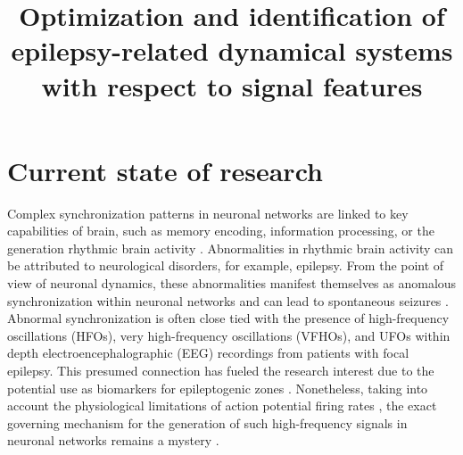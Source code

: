 \documentclass[a4paper,11pt]{scrartcl}
\title{Optimization and identification of epilepsy-related dynamical systems with respect to signal features}
\begin{document}
\maketitle
\tableofcontents

\newpage

\section{Current state of research}\label{sec:state}



Complex synchronization patterns in neuronal networks are linked to key capabilities of brain, such as memory encoding, information processing, or the generation rhythmic brain activity \cite{Izhikevich2006, Song2018}. Abnormalities in rhythmic brain activity can be attributed to neurological disorders, for example, epilepsy. From the point of view of neuronal dynamics, these abnormalities manifest themselves as anomalous synchronization within neuronal networks and can lead to spontaneous seizures \cite{Jiruska2013}. Abnormal synchronization is often close tied with the presence of high-frequency oscillations (HFOs), very high-frequency oscillations (VFHOs), and \acp{UFO} within depth electroencephalographic (EEG) recordings from patients with focal epilepsy. This presumed connection has fueled the research interest due to the potential use as biomarkers for epileptogenic zones \cite{Jacobs2008, Worrell2011, Staba2011, Jacobs2012, Zijlmans2012, Brazdil2017, Cimbalnik2018, Cimbalnik2020, Brazdil2023}. Nonetheless, taking into account the physiological limitations of action potential firing rates \cite{Gabbiani2010}, the exact governing mechanism for the generation of such high-frequency signals in neuronal networks remains a mystery \cite{Jiruska2017}.
\end{document}
